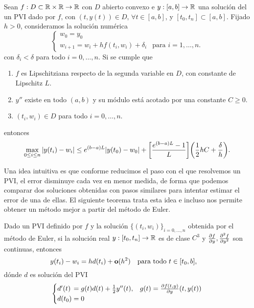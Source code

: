 \begin{theorem}
    Sean $f : D \subset \mathbb{R} \times \mathbb{R} \to \mathbb{R}$ con $D$ abierto convexo
    e $y : [a, b] \to \mathbb{R}$ una solución del un PVI dado por $f$,
    con $(t, y(t)) \in D$, $\forall t \in [a, b]$,
    y $[t_0, t_n] \subset [a, b]$.
    Fijado $h > 0$, consideramos la solución numérica
    \begin{equation}
    \begin{cases}
        w_0 = y_0 \\
        w_{i+1} = w_i + hf(t_i, w_i) + \delta_i & \text{para $i = 1,\ldots,n$.}
    \end{cases}
    \end{equation}
    con $\delta_i < \delta$ para todo $i = 0,\ldots,n$.
    Si se cumple que
    \begin{enumerate}[label=(\alph*)]
        \item $f$ es Lipschitziana respecto de la segunda variable en $D$,
        con constante de Lipschitz $L$.
        \item $y''$ existe en todo $(a, b)$ y
        su módulo está acotado por una constante $C \ge 0$.
        \item $(t_i, w_i) \in D$ para todo $i = 0,\dots,n$.
    \end{enumerate}
    entonces
    \begin{equation*}
        \max_{0 \le i \le n} \abs{y(t_i)-w_i} \le
        e^{(b-a)L}\abs{y(t_0) - w_0} + \qty[\frac{e^{(b-a)L}-1}{L}]\qty(
            \frac{1}{2}hC + \frac{\delta}{h}
        ).
    \end{equation*}
\end{theorem}

Una idea intuitiva es que
conforme reducimos el paso con el que resolvemos un PVI,
el error disminuye cada vez en menor medida,
de forma que podemos comparar dos soluciones obtenidas con pasos similares
para intentar estimar el error de una de ellas.
El siguiente teorema trata esta idea e incluso
nos permite obtener un método mejor a partir del método de Euler.

\begin{theorem}
    Dado un PVI definido por $f$
    y la solución $\{(t_i, w_i)\}_{i = 0,\ldots, n}$
    obtenida por el método de Euler,
    si la solución real $y : [t_0, t_n] \to \mathbb{R}$ es de clase $C^3$
    y $\pdv{f}{y},\pdv[2]{f}{y}$ son continuas,
    entonces
    \begin{equation}
        y(t_i) - w_i = hd(t_i) + \vo(h^2) \qq{para todo $t \in [t_0,b]$,}
    \end{equation}
    dónde $d$ es solución del PVI
    \begin{equation}
    \begin{cases}
        d'(t) \, = g(t)d(t) + \frac{1}{2}y''(t),
            & g(t) = \pdv{f(t,y)}{y}\qty(t, y(t)) \\
        d(t_0) = 0
    \end{cases}
    \end{equation}
\end{theorem}

